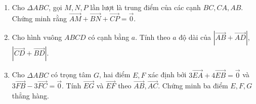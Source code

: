 \begin{bt}%
\begin{enumerate}
\item Cho $\Delta ABC$, gọi $M,N,P$ lần lượt là trung điểm của các cạnh $BC, CA, AB$. Chứng minh rằng $\overrightarrow{AM} +\overrightarrow{BN} + \overrightarrow{CP} = \overrightarrow{0}.$
\item Cho hình vuông $ABCD$ có cạnh bằng $a$. Tính theo $a$ độ dài của $\left| \overrightarrow{AB} + \overrightarrow{AD} \right|$,$\left| \overrightarrow{CD} + \overrightarrow{BD} \right|$.
\item Cho $\Delta ABC$ có trọng tâm $G$, hai điểm $E,F$ xác định bởi $3 \overrightarrow{EA} + 4 \overrightarrow{EB} = \overrightarrow{0}$ và $3 \overrightarrow{FB} - 3 \overrightarrow{FC} = \overrightarrow{0}$. Tính $\overrightarrow{EG}$ và $\overrightarrow{EF}$ theo $\overrightarrow{AB}, \overrightarrow{AC}$. Chứng minh ba điểm $E,F,G$ thẳng hàng.
\end{enumerate}
\end{bt}

